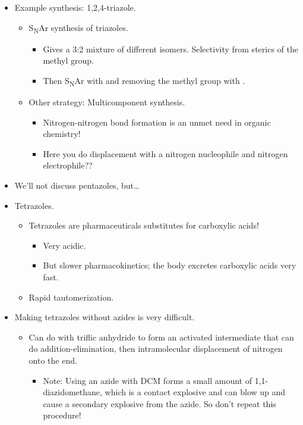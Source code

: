 \documentclass[../notes.tex]{subfiles}
\begin{document}
\begin{itemize}
    \item Example synthesis: 1,2,4-triazole.
    \begin{itemize}
        \item S\textsubscript{N}Ar synthesis of triazoles.
        \begin{itemize}
            \item Gives a 3:2 mixture of different isomers. Selectivity from sterics of the methyl group.
            \item Then S\textsubscript{N}Ar with  and removing the methyl group with .
        \end{itemize}
        \item Other strategy: Multicomponent synthesis.
        \begin{itemize}
            \item Nitrogen-nitrogen bond formation is an unmet need in organic chemistry!
            \item Here you do displacement with a nitrogen nucleophile and nitrogen electrophile??
        \end{itemize}
    \end{itemize}
    \item We'll not discuss pentazoles, but\dots
    \item Tetrazoles.
    \begin{itemize}
        \item Tetrazoles are pharmaceuticals substitutes for carboxylic acids!
        \begin{itemize}
            \item Very acidic.
            \item But slower pharmacokinetics; the body excretes carboxylic acids very fast.
        \end{itemize}
        \item Rapid tautomerization.
    \end{itemize}
    \item Making tetrazoles without azides is very difficult.
    \begin{itemize}
        \item Can do with triflic anhydride to form an activated intermediate that can do addition-elimination, then intramolecular displacement of nitrogen onto the end.
        \begin{itemize}
            \item Note: Using an azide with DCM forms a small amount of 1,1-diazidomethane, which is a contact explosive and can blow up and cause a secondary explosive from the azide. So don't repeat this procedure!

\end{itemize}
\end{itemize}
\end{itemize}
\end{document}
